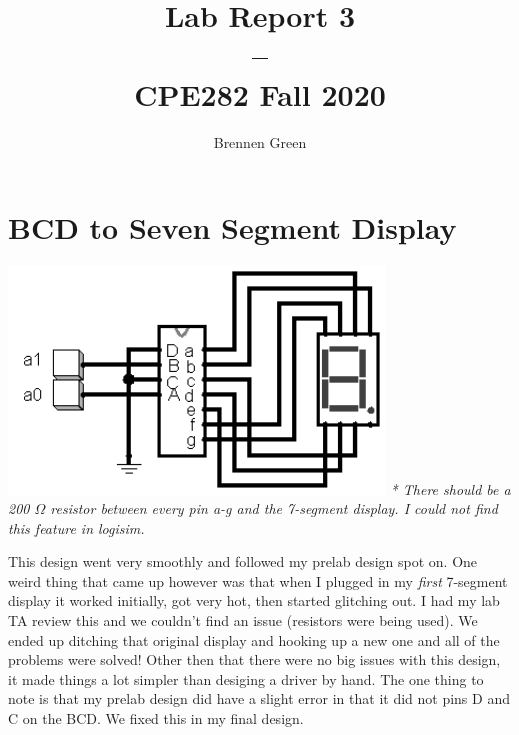 \documentclass[11pt]{article}
\begin{document}
\date{} 
\title{Lab Report 3\\--\\\large CPE282 Fall 2020}
\author{Brennen Green}
\maketitle

\section*{BCD to Seven Segment Display}
\begin{center}
\includegraphics[width=10cm, keepaspectratio]{BCD-7SEG}\newline
\emph{* There should be a 200 $\Omega$  resistor between every pin a-g and the 7-segment display.
I could not find this feature in logisim.}
\end{center}
This design went very smoothly and followed my prelab design spot on. One weird thing that came up
however was that when I plugged in my \emph{first} 7-segment display it worked initially, got very hot,
then started glitching out. I had my lab TA review this and we couldn't find an issue (resistors were being used).
We ended up ditching that original display and hooking up a new one and all of the problems were solved! Other then
that there were no big issues with this design, it made things a lot simpler than desiging a driver by hand. The one
thing to note is that my prelab design did have a slight error in that it did not pins D and C on the BCD. We fixed
this in my final design.
\end{document}
